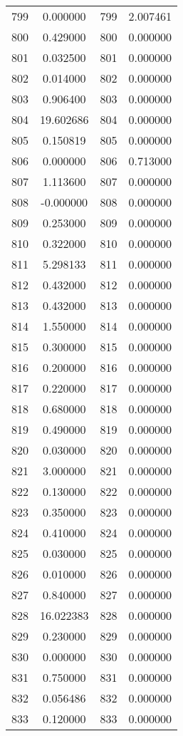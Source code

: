 \documentclass[12pt]{article}
\begin{document}
\begin{longtable}{@{}cccc@{}}
799 & 0.000000 & 799 & 2.007461 \\
800 & 0.429000 & 800 & 0.000000 \\
801 & 0.032500 & 801 & 0.000000 \\
802 & 0.014000 & 802 & 0.000000 \\
803 & 0.906400 & 803 & 0.000000 \\
804 & 19.602686 & 804 & 0.000000 \\
805 & 0.150819 & 805 & 0.000000 \\
806 & 0.000000 & 806 & 0.713000 \\
807 & 1.113600 & 807 & 0.000000 \\
808 & -0.000000 & 808 & 0.000000 \\
809 & 0.253000 & 809 & 0.000000 \\
810 & 0.322000 & 810 & 0.000000 \\
811 & 5.298133 & 811 & 0.000000 \\
812 & 0.432000 & 812 & 0.000000 \\
813 & 0.432000 & 813 & 0.000000 \\
814 & 1.550000 & 814 & 0.000000 \\
815 & 0.300000 & 815 & 0.000000 \\
816 & 0.200000 & 816 & 0.000000 \\
817 & 0.220000 & 817 & 0.000000 \\
818 & 0.680000 & 818 & 0.000000 \\
819 & 0.490000 & 819 & 0.000000 \\
820 & 0.030000 & 820 & 0.000000 \\
821 & 3.000000 & 821 & 0.000000 \\
822 & 0.130000 & 822 & 0.000000 \\
823 & 0.350000 & 823 & 0.000000 \\
824 & 0.410000 & 824 & 0.000000 \\
825 & 0.030000 & 825 & 0.000000 \\
826 & 0.010000 & 826 & 0.000000 \\
827 & 0.840000 & 827 & 0.000000 \\
828 & 16.022383 & 828 & 0.000000 \\
829 & 0.230000 & 829 & 0.000000 \\
830 & 0.000000 & 830 & 0.000000 \\
831 & 0.750000 & 831 & 0.000000 \\
832 & 0.056486 & 832 & 0.000000 \\
833 & 0.120000 & 833 & 0.000000 \\

\end{longtable}
\end{document}
